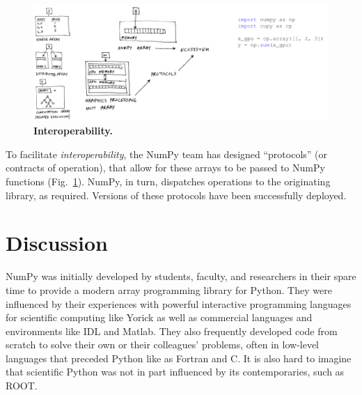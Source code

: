 \begin{figure}
  \centering
  \includegraphics[width=\textwidth]{static/sketches/duck-arrays}
  \caption{\textbf{Interoperability.} }  \label{fig:duck-arrays}
\end{figure}


To facilitate \emph{interoperability}, the NumPy team has designed
``protocols'' (or contracts of operation), that allow for these arrays to be
passed to NumPy functions (Fig.~\ref{fig:duck-arrays}).
NumPy, in turn, dispatches operations to the originating library, as required.
Versions of these protocols have been successfully deployed.


\section*{Discussion}


NumPy was initially developed by students, faculty, and researchers in their
spare time to provide a modern array programming library for Python.  They were
influenced by their experiences with powerful interactive programming languages
for scientific computing like Yorick \cite{munro1995using} as well as
commercial languages and environments like IDL and Matlab.  They also
frequently developed code from scratch to solve their own or their colleagues'
problems, often in low-level languages that preceded Python like as Fortran
\cite{dongarra2008netlib} and C.  It is also hard to imagine that scientific
Python was not in part influenced by its contemporaries, such as ROOT.

